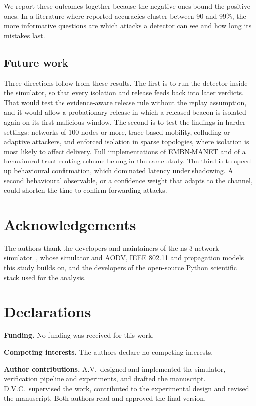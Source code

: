 We report these outcomes together because the negative ones bound the positive
ones. In a literature where reported accuracies cluster between 90 and 99\%, the more
informative questions are which attacks a detector can see and how long its
mistakes last.

\subsection{Future work}
\label{sec:future}

Three directions follow from these results. The first is to run the detector
inside the simulator, so that every isolation and release feeds back into
later verdicts. That would test the evidence-aware release rule without the
replay assumption, and it would allow a probationary release in which a
released beacon is isolated again on its first malicious window. The second
is to test the findings in harder settings: networks of 100 nodes or more,
trace-based mobility, colluding or adaptive attackers, and enforced
isolation in sparse topologies, where isolation is most likely to affect
delivery. Full implementations of EMBN-MANET and of a behavioural
trust-routing scheme belong in the same study. The third is to speed up
behavioural confirmation, which dominated latency under shadowing. A second
behavioural observable, or a confidence weight that adapts to the channel,
could shorten the time to confirm forwarding attacks.

\section*{Acknowledgements}

The authors thank the developers and maintainers of the ns-3 network
simulator~\cite{ns3}, whose simulator and AODV, IEEE 802.11 and propagation
models this study builds on, and the developers of the open-source Python
scientific stack used for the analysis.

\section*{Declarations}

\textbf{Funding.} No funding was received for this work.

\textbf{Competing interests.} The authors declare no competing interests.

\textbf{Author contributions.} A.V.\ designed and implemented the simulator,
verification pipeline and experiments, and drafted the manuscript. D.V.C.\
supervised the work, contributed to the experimental design and revised the
manuscript. Both authors read and approved the final version.

